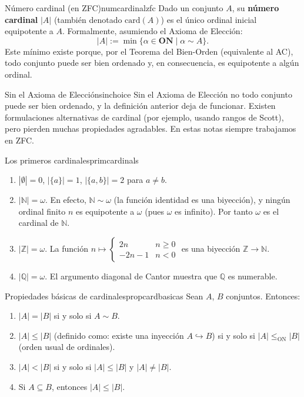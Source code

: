 \begin{definicion}{Número cardinal (en ZFC)}{numcardinalzfc}
Dado un conjunto $A$, su \textbf{número cardinal} $|A|$ (también denotado $\mathrm{card}(A)$) es el único ordinal inicial equipotente a $A$. Formalmente, asumiendo el Axioma de Elección:
\[
  |A| := \min\bigl\{\alpha \in \mathbf{ON} \mid \alpha \sim A\bigr\}.
\]
Este mínimo existe porque, por el Teorema del Bien-Orden (equivalente al AC), todo conjunto puede ser bien ordenado y, en consecuencia, es equipotente a algún ordinal.
\end{definicion}

\begin{observacion}{Sin el Axioma de Elección}{sinchoice}
Sin el Axioma de Elección no todo conjunto puede ser bien ordenado, y la definición anterior deja de funcionar. Existen formulaciones alternativas de cardinal (por ejemplo, usando rangos de Scott), pero pierden muchas propiedades agradables. En estas notas siempre trabajamos en ZFC.
\end{observacion}

\begin{ejemplo}{Los primeros cardinales}{primcardinals}
\begin{enumerate}[leftmargin=2em, label=(\alph*)]
  \item $|\emptyset| = 0$, $|\{a\}| = 1$, $|\{a,b\}| = 2$ para $a \neq b$.
  \item $|\mathbb{N}| = \omega$. En efecto, $\mathbb{N} \sim \omega$ (la función identidad es una biyección), y ningún ordinal finito $n$ es equipotente a $\omega$ (pues $\omega$ es infinito). Por tanto $\omega$ es el cardinal de $\mathbb{N}$.
  \item $|\mathbb{Z}| = \omega$. La función $n \mapsto \begin{cases} 2n & n \geq 0 \\ -2n-1 & n < 0 \end{cases}$ es una biyección $\mathbb{Z} \to \mathbb{N}$.
  \item $|\mathbb{Q}| = \omega$. El argumento diagonal de Cantor muestra que $\mathbb{Q}$ es numerable.
\end{enumerate}
\end{ejemplo}

\begin{proposicion}{Propiedades básicas de cardinales}{propcardbasicas}
Sean $A$, $B$ conjuntos. Entonces:
\begin{enumerate}[leftmargin=2em, label=(\roman*)]
  \item $|A| = |B|$ si y solo si $A \sim B$.
  \item $|A| \leq |B|$ (definido como: existe una inyección $A \hookrightarrow B$) si y solo si $|A| \leq_{\mathrm{ON}} |B|$ (orden usual de ordinales).
  \item $|A| < |B|$ si y solo si $|A| \leq |B|$ y $|A| \neq |B|$.
  \item Si $A \subseteq B$, entonces $|A| \leq |B|$.
\end{enumerate}
\end{proposicion}

